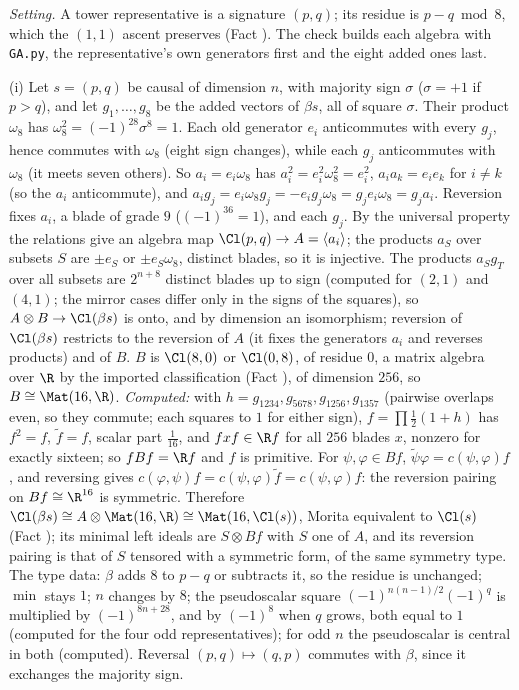 \emph{Setting.} A tower representative is a signature $(p,q)$; its residue is $p - q \bmod 8$, which the $(1,1)$ ascent preserves (Fact ). The check builds each algebra with \texttt{GA.py}, the representative's own generators first and the eight added ones last.

(i) Let $s = (p,q)$ be causal of dimension $n$, with majority sign $\sigma$ ($\sigma = +1$ if $p > q$), and let $g_{1}, \dots, g_{8}$ be the added vectors of $\beta s$, all of square $\sigma$. Their product $\omega_{8}$ has $\omega_{8}^{2} = (-1)^{28}\sigma^{8} = 1$. Each old generator $e_{i}$ anticommutes with every $g_{j}$, hence commutes with $\omega_{8}$ (eight sign changes), while each $g_{j}$ anticommutes with $\omega_{8}$ (it meets seven others). So $a_{i} = e_{i}\omega_{8}$ has $a_{i}^{2} = e_{i}^{2}\omega_{8}^{2} = e_{i}^{2}$, $a_{i}a_{k} = e_{i}e_{k}$ for $i \ne k$ (so the $a_{i}$ anticommute), and $a_{i}g_{j} = e_{i}\omega_{8}g_{j} = -e_{i}g_{j}\omega_{8} = g_{j}e_{i}\omega_{8} = g_{j}a_{i}$. Reversion fixes $a_{i}$, a blade of grade $9$ ($(-1)^{36} = 1$), and each $g_{j}$. By the universal property the relations give an algebra map $\Cl(p,q) \to A = \langle a_{i}\rangle$; the products $a_{S}$ over subsets $S$ are $\pm e_{S}$ or $\pm e_{S}\omega_{8}$, distinct blades, so it is injective. The products $a_{S}g_{T}$ over all subsets are $2^{n+8}$ distinct blades up to sign (computed for $(2,1)$ and $(4,1)$; the mirror cases differ only in the signs of the squares), so $A \otimes B \to \Cl(\beta s)$ is onto, and by dimension an isomorphism; reversion of $\Cl(\beta s)$ restricts to the reversion of $A$ (it fixes the generators $a_{i}$ and reverses products) and of $B$. $B$ is $\Cl(8,0)$ or $\Cl(0,8)$, of residue $0$, a matrix algebra over $\R$ by the imported classification (Fact ), of dimension $256$, so $B \cong \Mat(16,\R)$. \emph{Computed:} with $h = g_{1234}, g_{5678}, g_{1256}, g_{1357}$ (pairwise overlaps even, so they commute; each squares to $1$ for either sign), $f = \prod\tfrac12(1 + h)$ has $f^{2} = f$, $\widetilde{f} = f$, scalar part $\tfrac1{16}$, and $fxf \in \R f$ for all $256$ blades $x$, nonzero for exactly sixteen; so $fBf = \R f$ and $f$ is primitive. For $\psi, \varphi \in Bf$, $\widetilde{\psi}\varphi = c(\psi,\varphi)f$, and reversing gives $c(\varphi,\psi)f = c(\psi,\varphi)\widetilde{f} = c(\psi,\varphi)f$: the reversion pairing on $Bf \cong \R^{16}$ is symmetric. Therefore $\Cl(\beta s) \cong A \otimes \Mat(16,\R) \cong \Mat(16, \Cl(s))$, Morita equivalent to $\Cl(s)$ (Fact ); its minimal left ideals are $S \otimes Bf$ with $S$ one of $A$, and its reversion pairing is that of $S$ tensored with a symmetric form, of the same symmetry type. The type data: $\beta$ adds $8$ to $p - q$ or subtracts it, so the residue is unchanged; $\min$ stays $1$; $n$ changes by $8$; the pseudoscalar square $(-1)^{n(n-1)/2}(-1)^{q}$ is multiplied by $(-1)^{8n + 28}$, and by $(-1)^{8}$ when $q$ grows, both equal to $1$ (computed for the four odd representatives); for odd $n$ the pseudoscalar is central in both (computed). Reversal $(p,q) \mapsto (q,p)$ commutes with $\beta$, since it exchanges the majority sign.

